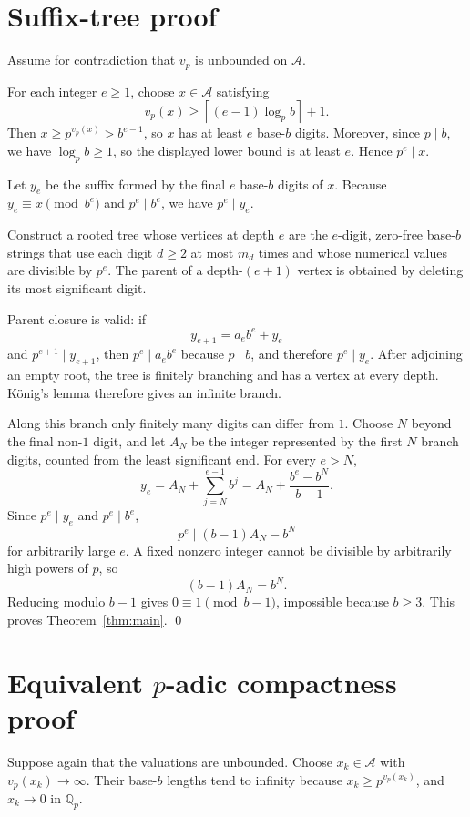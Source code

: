 \documentclass[11pt]{article}
\begin{document}
\section{Suffix-tree proof}

Assume for contradiction that $v_p$ is unbounded on $\mathcal A$.

For each integer $e\ge1$, choose $x\in\mathcal A$ satisfying
\[
v_p(x)\ge \left\lceil (e-1)\log_p b\right\rceil+1.
\]
Then $x\ge p^{v_p(x)}>b^{e-1}$, so $x$ has at least $e$ base-$b$ digits.
Moreover, since $p\mid b$, we have $\log_p b\ge1$, so the displayed lower bound
is at least $e$. Hence $p^e\mid x$.

Let $y_e$ be the suffix formed by the final $e$ base-$b$ digits of $x$.
Because $y_e\equiv x\pmod{b^e}$ and $p^e\mid b^e$, we have $p^e\mid y_e$.

Construct a rooted tree whose vertices at depth $e$ are the $e$-digit,
zero-free base-$b$ strings that use each digit $d\ge2$ at most $m_d$ times and
whose numerical values are divisible by $p^e$. The parent of a depth-$(e+1)$
vertex is obtained by deleting its most significant digit.

Parent closure is valid: if
\[
y_{e+1}=a_e b^e+y_e
\]
and $p^{e+1}\mid y_{e+1}$, then $p^e\mid a_e b^e$ because $p\mid b$, and
therefore $p^e\mid y_e$. After adjoining an empty root, the tree is finitely
branching and has a vertex at every depth. K\"onig's lemma therefore gives an
infinite branch.

Along this branch only finitely many digits can differ from $1$. Choose $N$
beyond the final non-$1$ digit, and let $A_N$ be the integer represented by the
first $N$ branch digits, counted from the least significant end. For every
$e>N$,
\[
y_e
 =A_N+\sum_{j=N}^{e-1}b^j
 =A_N+\frac{b^e-b^N}{b-1}.
\]
Since $p^e\mid y_e$ and $p^e\mid b^e$,
\[
p^e\mid (b-1)A_N-b^N
\]
for arbitrarily large $e$. A fixed nonzero integer cannot be divisible by
arbitrarily high powers of $p$, so
\[
(b-1)A_N=b^N.
\]
Reducing modulo $b-1$ gives $0\equiv1\pmod{b-1}$, impossible because $b\ge3$.
This proves Theorem~\ref{thm:main}. \qed

\section{Equivalent $p$-adic compactness proof}

Suppose again that the valuations are unbounded. Choose
$x_k\in\mathcal A$ with $v_p(x_k)\to\infty$. Their base-$b$ lengths tend to
infinity because $x_k\ge p^{v_p(x_k)}$, and $x_k\to0$ in $\mathbb Q_p$.
\end{document}
